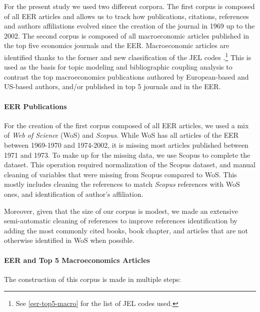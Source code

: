 \documentclass[]{elsarticle} %
\begin{document}
For the present study we used two different corpora. The first corpus is
composed of all EER articles and allows us to track how publications,
citations, references and authors affiliations evolved since the
creation of the journal in 1969 up to the 2002. The second corpus is
composed of all macroeconomic articles published in the top five
economics journals and the EER. Macroeconomic articles are identified
thanks to the former and new classification of the JEL codes
\citep{jel1991}.\footnote{See \ref{eer-top5-macro} for the list of JEL
  codes used.} This is used as the basis for topic modeling and
bibliographic coupling analysis to contrast the top macroeconomics
publications authored by European-based and US-based authors, and/or
published in top 5 journals and in the EER.

\hypertarget{eer-publications}{%
\paragraph*{EER Publications}\label{eer-publications}}

For the creation of the first corpus composed of all EER articles, we
used a mix of \emph{Web of Science} (WoS) and \emph{Scopus}. While WoS
has all articles of the EER between 1969-1970 and 1974-2002, it is
missing most articles published between 1971 and 1973. To make up for
the missing data, we use Scopus to complete the dataset. This operation
required normalization of the Scopus dataset, and manual cleaning of
variables that were missing from Scopus compared to WoS. This mostly
includes cleaning the references to match \emph{Scopus} references with
WoS ones, and identification of author's affiliation.

Moreover, given that the size of our corpus is modest, we made an
extensive semi-automatic cleaning of references to improve references
identification by adding the most commonly cited books, book chapter,
and articles that are not otherwise identified in WoS when possible.

\hypertarget{eer-top5-macro}{%
\paragraph*{EER and Top 5 Macroeconomics
Articles}\label{eer-top5-macro}}

The construction of this corpus is made in multiple steps:
\end{document}
